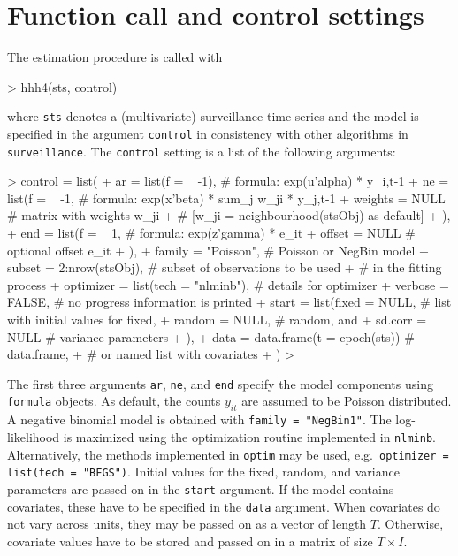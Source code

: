 \documentclass[a4paper,11pt]{article}
\newcommand{\surveillance}{\texttt{surveillance}}
\newcommand{\code}[1]{\texttt{#1}}
\begin{document}
\section{Function call and control settings}\label{sec:hhh}

The estimation procedure is called with
\begin{Schunk}
\begin{Sinput}
> hhh4(sts, control)
\end{Sinput}
\end{Schunk}
where \code{sts} denotes a (multivariate) surveillance time series and
the model is specified in the argument \code{control} in consistency
with other algorithms in \surveillance.
The \code{control} setting is a list of the following arguments:

\begin{Schunk}
\begin{Sinput}
> control = list(
+     ar = list(f = ~ -1),       # formula: exp(u'alpha) * y_i,t-1 
+     ne = list(f = ~ -1,        # formula: exp(x'beta) * sum_j {w_ji * y_j,t-1} 
+               weights = NULL   # matrix with weights w_ji 
+                                # [w_ji = neighbourhood(stsObj) as default]
+               ),              
+     end = list(f = ~ 1,        # formula:  exp(z'gamma) * e_it 
+               offset = NULL    # optional offset e_it 
+               ),
+     family = "Poisson",                # Poisson or NegBin model
+     subset = 2:nrow(stsObj),           # subset of observations to be used 
+                                        # in the fitting process
+     optimizer = list(tech = "nlminb"), # details for optimizer 
+     verbose = FALSE,                   # no progress information is printed
+     start = list(fixed = NULL,         # list with initial values for fixed,
+                  random = NULL,        # random, and
+                  sd.corr = NULL        # variance parameters
+                  ),
+     data = data.frame(t = epoch(sts))  # data.frame,
+                                        # or named list with covariates 
+     )
>            
\end{Sinput}
\end{Schunk}
The first three arguments \code{ar}, \code{ne}, and \code{end} 
specify the model components using \code{formula} objects.
As default, the counts $y_{it}$ are assumed to be Poisson distributed.
A negative binomial model is obtained with \code{family = "NegBin1"}.
The log-likelihood is maximized using the optimization routine implemented
in \code{nlminb}. Alternatively, the methods implemented in
\code{optim} may be used, e.g.\ \code{optimizer = list(tech = "BFGS")}.
Initial values for the fixed, random, and variance parameters 
are passed on in the \code{start} argument.
If the model contains covariates, these have to be specified in the \code{data} 
argument. When covariates do not vary across units, they may be passed on as a 
vector of length $T$. Otherwise, covariate values have to be stored and passed on
in a matrix of size $T \times I$.
\end{document}
